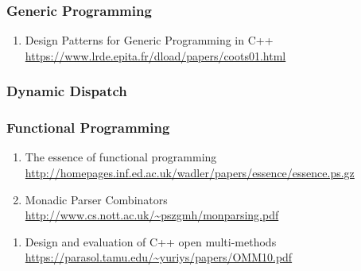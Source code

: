 \documentclass{article}
\begin{document}
\subsubsection{Generic Programming}
	\begin{enumerate}
	\item {Design Patterns for Generic Programming in C++\\ \url{https://www.lrde.epita.fr/dload/papers/coots01.html}}
	\end{enumerate}
\subsubsection{Dynamic Dispatch}
\subsubsection{Functional Programming}
\begin{enumerate}
	\item{The essence of functional programming \\
\url{http://homepages.inf.ed.ac.uk/wadler/papers/essence/essence.ps.gz}}
	\item {Monadic Parser Combinators\\
\url{http://www.cs.nott.ac.uk/~pszgmh/monparsing.pdf}}
\end{enumerate}
\begin{enumerate}
	\item {Design and evaluation of C++ open multi-methods\\
\url{https://parasol.tamu.edu/~yuriys/papers/OMM10.pdf}}
\end{enumerate}
\end{document}
